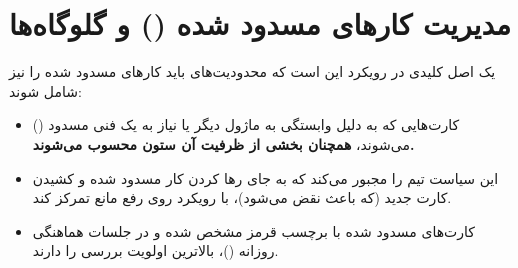 \section{مدیریت کارهای مسدود شده () و گلوگاه‌ها}
یک اصل کلیدی در رویکرد  این است که محدودیت‌های  باید کارهای مسدود شده را نیز شامل شوند:
\begin{itemize}
	\item کارت‌هایی که به دلیل وابستگی به ماژول دیگر یا نیاز به یک  فنی مسدود () می‌شوند، \textbf{همچنان بخشی از ظرفیت  آن ستون محسوب می‌شوند.}
	\item این سیاست تیم را مجبور می‌کند که به جای رها کردن کار مسدود شده و کشیدن کارت جدید (که باعث نقض  می‌شود)، با رویکرد  روی رفع مانع تمرکز کند.
	\item کارت‌های مسدود شده با برچسب قرمز مشخص شده و در جلسات هماهنگی روزانه ()، بالاترین اولویت بررسی را دارند.
\end{itemize}